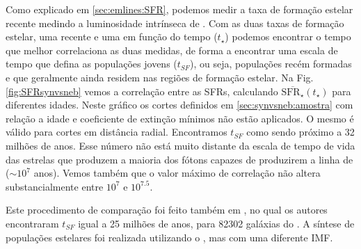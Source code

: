 Como explicado em \ref{sec:emlines:SFR}, podemos medir a taxa de formação estelar recente medindo a
luminosidade intrínseca de \Halpha. Com as duas taxas de formação estelar, uma recente e uma em
função do tempo ($t_\star$) podemos encontrar o tempo que melhor correlaciona as duas medidas, de
forma a encontrar uma escala de tempo que defina as populações jovens ($t_{SF}$), ou seja,
populações recém formadas e que geralmente ainda residem nas regiões de formação estelar. Na Fig.
\ref{fig:SFRsynvsneb} vemos a correlação entre as SFRs, calculando
$\overline{\mathrm{SFR}_\star}(t_\star)$ para diferentes idades. Neste gráfico os cortes
definidos em \ref{sec:synvsneb:amostra} com relação a idade e coeficiente de extinção mínimos não
estão aplicados. O mesmo é válido para cortes em distância radial. Encontramos $t_{SF}$ como sendo
próximo a 32 milhões de anos. Esse número não está muito distante da escala de tempo de vida das
estrelas que produzem a maioria dos fótons capazes de produzirem a linha de \Halpha ($\sim10^7$
anos). Vemos também que o valor máximo de correlação não altera substancialmente entre $10^7$ e
$10^{7.5}$.

Este procedimento de comparação foi feito também em \citet{Asari.etal.2007a}, no qual os autores
encontraram $t_{SF}$ igual a 25 milhões de anos, para 82302 galáxias do \SDSS. A síntese de
populações estelares foi realizada utilizando o \starlight, mas com uma diferente IMF.

